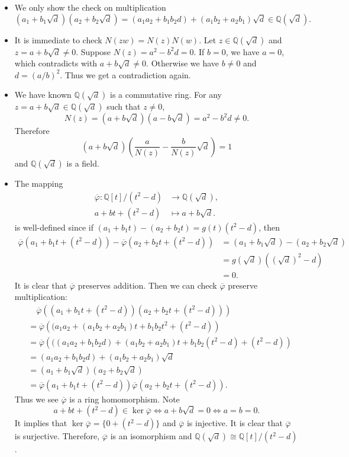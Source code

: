 \documentclass[12pt,letterpaper,boxed]{hmcpset}
\newcommand{\Q}{\mathbb{Q}}
\begin{document}
\begin{solution}
	\begin{itemize}
		\item We only show the check on multiplication
		\[
		(a_1+b_1 \sqrt{d})(a_2+b_2 \sqrt{d})=(a_1a_2+b_1b_2d)+(a_1b_2+a_2b_1)\sqrt{d}\in\Q(\sqrt{d}).
		\]
		\item It is immediate to check $N(z w)=N(z) N(w)$.	Let $z \in \mathbb{Q}(\sqrt{d})$ and $z=a+b\sqrt{d} \neq 0$. Suppose $N(z)=a^2-b^2d=0$. If $b=0$, we have $a=0$, which contradicts with $a+b\sqrt{d} \neq 0$. Otherwise we have $b\ne0$ and $d=(a/b)^2$. Thus we get a contradiction again.
		\item We have known $\mathbb{Q}(\sqrt{d})$ is a commutative ring. For any $z=a+b\sqrt{d}\in\mathbb{Q}(\sqrt{d})$ such that $z\ne0$,
		\[
		N(z)=(a+b \sqrt{d})(a-b \sqrt{d})=a^{2}-b^{2}d\ne0.
		\]
		Therefore
		\[
		\left(a+b \sqrt{d}\right)\left(\frac{a}{N(z)}-\frac{b}{N(z)} \sqrt{d}\right)=1
		\]
		and $\mathbb{Q}(\sqrt{d})$ is a field.
		\item The mapping
		\begin{align*}
		\overline{\varphi}:\mathbb{Q}[t] /\left(t^{2}-d\right)& \longrightarrow \Q(\sqrt{d}),\\
		a+bt+(t^{2}-d)& \longmapsto a+b\sqrt{d}.
		\end{align*}
		is well-defined since if $(a_1+b_1t)-(a_2+b_2t)=g(t)(t^2-d)$, then
		\begin{align*}
		\overline{\varphi}(a_1+b_1t+(t^{2}-d))-\overline{\varphi}(a_2+b_2t+(t^{2}-d))&=\left(a_1+b_1\sqrt{d}\right)-\left(a_2+b_2\sqrt{d}\right)\\
		&=g\left(\sqrt{d}\right)\left(\left(\sqrt{d}\right)^2-d\right)\\
		&=0.
		\end{align*}
		It is clear that $\overline{\varphi}$ preserves addition. Then we can check $\overline{\varphi}$ preserve multiplication:
		\begin{align*}
		&\hspace{1em}\overline{\varphi}\left((a_1+b_1t+(t^{2}-d))(a_2+b_2t+(t^{2}-d))\right)\\
		&=\overline{\varphi}\left((a_1a_2+(a_1b_2+a_2b_1)t+b_1b_2t^2+(t^{2}-d)\right)\\
		&=\overline{\varphi}\left(((a_1a_2+b_1b_2d)+(a_1b_2+a_2b_1)t+b_1b_2(t^2-d)+(t^{2}-d)\right)\\
		&=(a_1a_2+b_1b_2d)+(a_1b_2+a_2b_1)\sqrt{d}\\
		&=(a_1+b_1\sqrt{d})(a_2+b_2\sqrt{d})\\
		&=\overline{\varphi}\left(a_1+b_1t+(t^{2}-d)\right)\overline{\varphi}\left(a_2+b_2t+(t^{2}-d)\right).
		\end{align*}
		Thus we see $\overline{\varphi}$ is a ring homomorphism. Note
		\[
		a+bt+(t^{2}-d)\in\ker \overline{\varphi}\iff a+b\sqrt{d}=0\iff a=b=0.
		\]
		It implies that $\ker \overline{\varphi}=\{0+(t^2-d)\}$ and $\overline{\varphi}$ is injective. It is clear that $\overline{\varphi}$ is surjective. Therefore, $\overline{\varphi}$ is an isomorphism and $\mathbb{Q}(\sqrt{d})\cong \mathbb{Q}[t] /\left(t^{2}-d\right)$.
	\end{itemize}
\end{solution}
\end{document}
